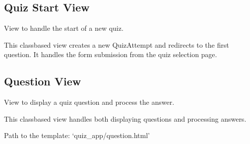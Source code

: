 \documentclass[letterpaper,10pt,english]{sphinxmanual}
\begin{document}
\subsection{Quiz Start View}
\label{\detokenize{views:quiz-start-view}}

\begin{fulllineitems}
\label{\detokenize{views:QuizStartView}}
\pysigstartsignatures
{}
\pysigstopsignatures
\sphinxAtStartPar
View to handle the start of a new quiz.

\sphinxAtStartPar
This class\sphinxhyphen{}based view creates a new QuizAttempt and redirects to the first question.
It handles the form submission from the quiz selection page.

\end{fulllineitems}



\subsection{Question View}
\label{\detokenize{views:question-view}}

\begin{fulllineitems}
\label{\detokenize{views:QuestionView}}
\pysigstartsignatures
{}
\pysigstopsignatures
\sphinxAtStartPar
View to display a quiz question and process the answer.

\sphinxAtStartPar
This class\sphinxhyphen{}based view handles both displaying questions and processing answers.

\begin{fulllineitems}
\label{\detokenize{views:QuestionView.template_name}}
\pysigstartsignatures
{}
\pysigstopsignatures
\sphinxAtStartPar
Path to the template: ‘quiz\_app/question.html’

\end{fulllineitems}


\end{fulllineitems}
\end{document}
